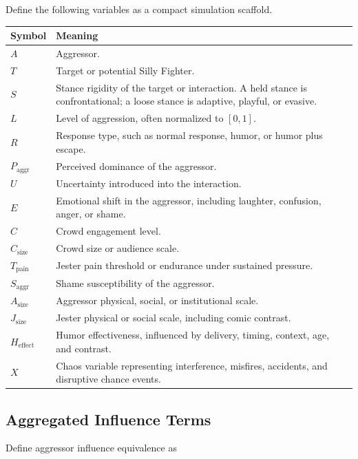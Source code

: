 \documentclass[11pt]{article}
\begin{document}
Define the following variables as a compact simulation scaffold.

\begin{longtable}{>{\raggedright\arraybackslash}p{}
                  >{\raggedright\arraybackslash}p{}}
\toprule
\textbf{Symbol} & \textbf{Meaning}\\
\midrule
\endhead

$A$ & Aggressor.\\
$T$ & Target or potential Silly Fighter.\\
$S$ & Stance rigidity of the target or interaction. A held stance is confrontational; a loose stance is adaptive, playful, or evasive.\\
$L$ & Level of aggression, often normalized to $[0,1]$.\\
$R$ & Response type, such as normal response, humor, or humor plus escape.\\
$P_{\mathrm{aggr}}$ & Perceived dominance of the aggressor.\\
$U$ & Uncertainty introduced into the interaction.\\
$E$ & Emotional shift in the aggressor, including laughter, confusion, anger, or shame.\\
$C$ & Crowd engagement level.\\
$C_{\mathrm{size}}$ & Crowd size or audience scale.\\
$T_{\mathrm{pain}}$ & Jester pain threshold or endurance under sustained pressure.\\
$S_{\mathrm{aggr}}$ & Shame susceptibility of the aggressor.\\
$A_{\mathrm{size}}$ & Aggressor physical, social, or institutional scale.\\
$J_{\mathrm{size}}$ & Jester physical or social scale, including comic contrast.\\
$H_{\mathrm{effect}}$ & Humor effectiveness, influenced by delivery, timing, context, age, and contrast.\\
$X$ & Chaos variable representing interference, misfires, accidents, and disruptive chance events.\\

\bottomrule
\end{longtable}

\subsection{Aggregated Influence Terms}

Define aggressor influence equivalence as
\end{document}
